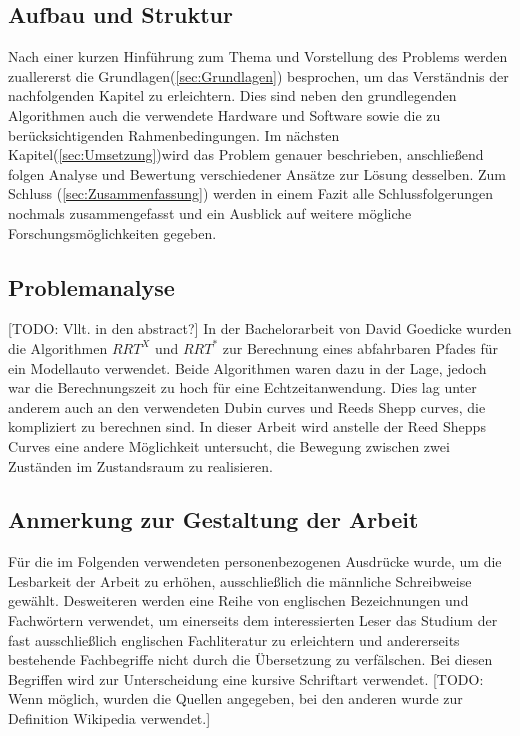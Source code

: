 \subsection{Aufbau und Struktur}
Nach einer kurzen Hinführung zum Thema und Vorstellung des Problems werden zuallererst die Grundlagen(\ref{sec:Grundlagen}) besprochen, um das Verständnis der nachfolgenden Kapitel zu erleichtern. Dies sind neben den grundlegenden Algorithmen auch die verwendete Hardware und Software sowie die zu berücksichtigenden Rahmenbedingungen. Im nächsten Kapitel(\ref{sec:Umsetzung})wird das Problem genauer beschrieben, anschließend folgen Analyse und Bewertung verschiedener Ansätze zur Lösung desselben. Zum Schluss (\ref{sec:Zusammenfassung}) werden in einem Fazit alle Schlussfolgerungen nochmals zusammengefasst und ein Ausblick auf weitere mögliche Forschungsmöglichkeiten gegeben. \\ 
\subsection{Problemanalyse}
\label{sec:Problemanalyse}
[TODO: Vllt. in den abstract?]
In der Bachelorarbeit von David Goedicke \citep{Goedicke18} wurden die Algorithmen $RRT^X$ und $RRT^*$ zur Berechnung eines abfahrbaren Pfades für ein Modellauto verwendet. Beide Algorithmen waren dazu in der Lage, jedoch war die Berechnungszeit zu hoch für eine Echtzeitanwendung. Dies lag unter anderem auch an den verwendeten Dubin curves und Reeds Shepp curves, die kompliziert zu berechnen sind. In dieser Arbeit wird anstelle der Reed Shepps Curves eine andere Möglichkeit untersucht, die Bewegung zwischen zwei Zuständen im Zustandsraum zu realisieren.


\subsection{Anmerkung zur Gestaltung der Arbeit}
Für die im Folgenden verwendeten personenbezogenen
Ausdrücke wurde, um die Lesbarkeit der Arbeit zu erhöhen,
ausschließlich die männliche Schreibweise gewählt. Desweiteren werden eine
Reihe von englischen Bezeichnungen und Fachwörtern verwendet, um einerseits dem
interessierten Leser das Studium der fast ausschließlich englischen
Fachliteratur zu erleichtern und andererseits bestehende Fachbegriffe nicht durch die Übersetzung zu verfälschen. Bei diesen Begriffen wird zur Unterscheidung eine kursive Schriftart verwendet.
[TODO: Wenn möglich, wurden die Quellen angegeben, bei den anderen wurde zur Definition Wikipedia verwendet.]


